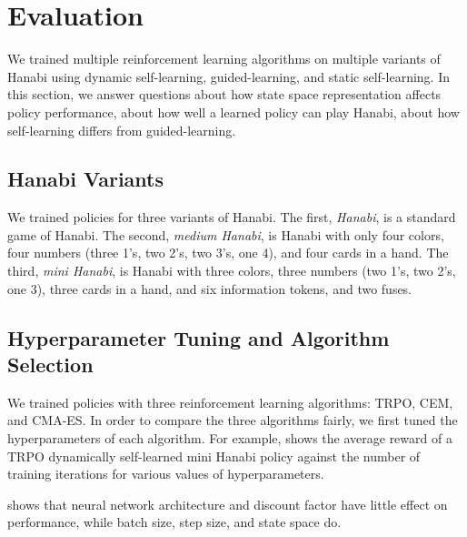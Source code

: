 \section{Evaluation}\label{sec:eval}

We trained multiple reinforcement learning algorithms on multiple variants of
Hanabi using dynamic self-learning, guided-learning, and static self-learning.
In this section, we answer questions about how state space representation
affects policy performance, about how well a learned policy can play Hanabi,
about how self-learning differs from guided-learning.

\subsection{Hanabi Variants}\label{sec:eval:hanabivariants}
We trained policies for three variants of Hanabi. The first, \emph{Hanabi}, is
a standard game of Hanabi. The second, \emph{medium Hanabi}, is Hanabi with
only four colors, four numbers (three 1's, two 2's, two 3's, one 4), and four
cards in a hand. The third, \emph{mini Hanabi}, is Hanabi with three colors,
three numbers (two 1's, two 2's, one 3), three cards in a hand, and six
information tokens, and two fuses.

\subsection{Hyperparameter Tuning and Algorithm Selection}
We trained policies with three reinforcement learning algorithms: TRPO, CEM,
and CMA-ES. In order to compare the three algorithms fairly, we first tuned the
hyperparameters of each algorithm. For example,  shows the
average reward of a TRPO dynamically self-learned mini Hanabi policy against
the number of training iterations for various values of hyperparameters.

 shows that neural network architecture and discount factor
have little effect on performance, while batch size, step size, and state space
do.

